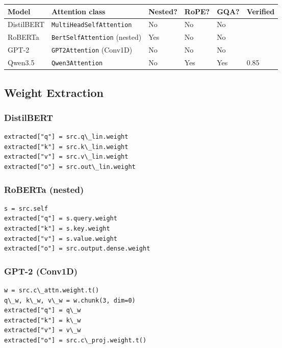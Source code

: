 \begin{table}[H]
\centering
\small
\begin{tabular}{llllll}
\toprule
\textbf{Model} & \textbf{Attention class} & \textbf{Nested?} & \textbf{RoPE?} & \textbf{GQA?} & \textbf{Verified} \\
\midrule
DistilBERT & \texttt{MultiHeadSelfAttention} & No & No & No &  \\
RoBERTa & \texttt{BertSelfAttention} (nested) & Yes & No & No &  \\
GPT-2 & \texttt{GPT2Attention} (Conv1D) & No & No & No &  \\
Qwen3.5 & \texttt{Qwen3Attention} & No & Yes & Yes & 0.85 \\
\bottomrule
\end{tabular}
\end{table}

\subsection{Weight Extraction}

\subsubsection{DistilBERT}

\begin{lstlisting}
extracted["q"] = src.q\_lin.weight
extracted["k"] = src.k\_lin.weight
extracted["v"] = src.v\_lin.weight
extracted["o"] = src.out\_lin.weight
\end{lstlisting}

\subsubsection{RoBERTa (nested)}

\begin{lstlisting}
s = src.self
extracted["q"] = s.query.weight
extracted["k"] = s.key.weight
extracted["v"] = s.value.weight
extracted["o"] = src.output.dense.weight
\end{lstlisting}

\subsubsection{GPT-2 (Conv1D)}

\begin{lstlisting}
w = src.c\_attn.weight.t()
q\_w, k\_w, v\_w = w.chunk(3, dim=0)
extracted["q"] = q\_w
extracted["k"] = k\_w
extracted["v"] = v\_w
extracted["o"] = src.c\_proj.weight.t()
\end{lstlisting}


